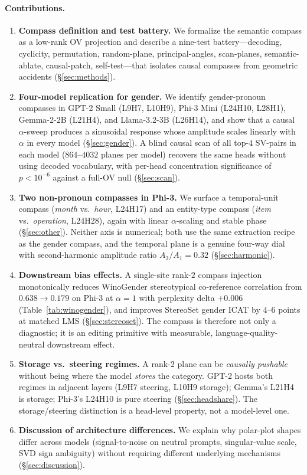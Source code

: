 \paragraph{Contributions.}
\begin{enumerate}
    \item \textbf{Compass definition and test battery.} We formalize the
    semantic compass as a low-rank OV projection and describe a nine-test
    battery---decoding, cyclicity, permutation, random-plane, principal-angles,
    scan-planes, semantic-ablate, causal-patch, self-test---that isolates
    causal compasses from geometric accidents (\S\ref{sec:methods}).
    \item \textbf{Four-model replication for gender.} We identify
    gender-pronoun compasses in GPT-2 Small (L9H7, L10H9), Phi-3 Mini
    (L24H10, L28H1), Gemma-2-2B (L21H4), and Llama-3.2-3B (L26H14), and
    show that a causal $\alpha$-sweep produces a sinusoidal response whose
    amplitude scales linearly with $\alpha$ in every model
    (\S\ref{sec:gender}). A blind causal scan of all top-$4$ SV-pairs in
    each model ($864$--$4032$ planes per model) recovers the same heads
    without using decoded vocabulary, with per-head concentration
    significance of $p < 10^{-6}$ against a full-OV null
    (\S\ref{sec:scan}).
    \item \textbf{Two non-pronoun compasses in Phi-3.} We surface a temporal-unit
    compass (\emph{month} vs.\ \emph{hour}, L24H17) and an entity-type compass
    (\emph{item} vs.\ \emph{operation}, L24H28), again with linear $\alpha$-scaling
    and stable phase (\S\ref{sec:other}). Neither axis is numerical;
    both use the same extraction recipe as the gender compass, and the
    temporal plane is a genuine four-way dial with second-harmonic
    amplitude ratio $A_2/A_1 = 0.32$ (\S\ref{sec:harmonic}).
    \item \textbf{Downstream bias effects.} A single-site rank-$2$
    compass injection monotonically reduces WinoGender stereotypical
    co-reference correlation from $0.638\to 0.179$ on Phi-3 at $\alpha=1$
    with perplexity delta $+0.006$ (Table~\ref{tab:winogender}), and
    improves StereoSet gender ICAT by $4\text{--}6$ points at matched
    LMS (\S\ref{sec:stereoset}). The compass is therefore not only a
    diagnostic; it is an editing primitive with measurable,
    language-quality-neutral downstream effect.
    \item \textbf{Storage vs.\ steering regimes.} A rank-$2$ plane can
    be \emph{causally pushable} without being where the model \emph{stores}
    the category. GPT-2 hosts both regimes in adjacent layers (L9H7 steering,
    L10H9 storage); Gemma's L21H4 is storage; Phi-3's L24H10 is pure
    steering (\S\ref{sec:headshare}). The storage/steering distinction
    is a head-level property, not a model-level one.
    \item \textbf{Discussion of architecture differences.} We explain why
    polar-plot shapes differ across models (signal-to-noise on neutral
    prompts, singular-value scale, SVD sign ambiguity) without requiring
    different underlying mechanisms (\S\ref{sec:discussion}).
\end{enumerate}
